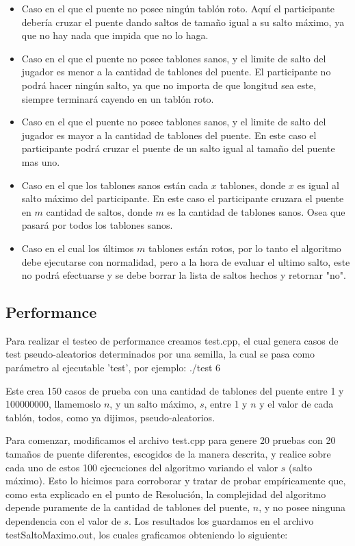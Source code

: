 \begin{itemize}

\item Caso en el que el puente no posee ningún tablón roto. Aquí el participante debería cruzar el puente dando saltos de tamaño igual a su salto máximo, ya que no hay nada que impida que no lo haga.

\item Caso en el que el puente no posee tablones sanos, y el limite de salto del jugador es menor a la cantidad de tablones del puente. El participante no podrá hacer ningún salto, ya que no importa de que longitud sea este, siempre terminará cayendo en un tablón roto.

\item Caso en el que el puente no posee tablones sanos, y el limite de salto del jugador es mayor a la cantidad de tablones del puente. En este caso el participante podrá cruzar el puente de un salto igual al tamaño del puente mas uno.

\item Caso en el que los tablones sanos están cada $x$ tablones, donde $x$ es igual al salto máximo del participante. En este caso el participante cruzara el puente en $m$ cantidad de saltos, donde $m$ es la cantidad de tablones sanos. Osea que pasará por todos los tablones sanos.

\item Caso en el cual los últimos $m$ tablones están rotos, por lo tanto el algoritmo debe ejecutarse con normalidad, pero a la hora de evaluar el ultimo salto, este no podrá efectuarse y se debe borrar la lista de saltos hechos y retornar "no".

\end{itemize}


\subsection{Performance}

Para realizar el testeo de performance creamos test.cpp, el cual genera casos de test pseudo-aleatorios determinados por una semilla, la cual se pasa como parámetro al ejecutable 'test', por ejemplo: ./test 6

Este crea 150 casos de prueba con una cantidad de tablones del puente entre 1 y 100000000, llamemoslo $n$, y un salto máximo, $s$, entre 1 y $n$ y el valor de cada tablón, todos, como ya dijimos, pseudo-aleatorios.

Para comenzar, modificamos el archivo test.cpp para genere 20 pruebas con 20 tamaños de puente diferentes, escogidos de la manera descrita, y realice sobre cada uno de estos 100 ejecuciones del algoritmo variando el valor $s$ (salto máximo).
Esto lo hicimos para corroborar y tratar de probar empíricamente que, como esta explicado en el punto de Resolución, la complejidad del algoritmo depende puramente de la cantidad de tablones del puente, $n$, y no posee ninguna dependencia con el valor de $s$.
Los resultados los guardamos en el archivo testSaltoMaximo.out, los cuales graficamos obteniendo lo siguiente:


